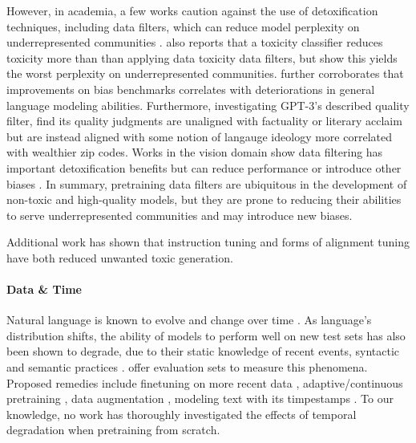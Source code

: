 \documentclass{article}
\begin{document}
However, in academia, a few works caution against the use of detoxification techniques, including data filters, which can reduce model perplexity on underrepresented communities \citep{xu-etal-2021-detoxifying, welbl2021challenges}.
\citet{welbl2021challenges} also reports that a toxicity classifier reduces toxicity more than than applying data toxicity data filters, but \citet{xu-etal-2021-detoxifying} show this yields the worst perplexity on underrepresented communities.
\citet{meade2022empirical} further corroborates that improvements on bias benchmarks correlates with deteriorations in general language modeling abilities.
Furthermore, investigating GPT-3's described quality filter, \citet{gururangan2022whose} find its quality judgments are unaligned with factuality or literary acclaim but are instead aligned with some notion of langauge ideology more correlated with wealthier zip codes.
Works in the vision domain show data filtering has important detoxification benefits but can reduce performance \citep{nichol2022glide} or introduce other biases \citep{dalle2pretraining2022}.
In summary, pretraining data filters are ubiquitous in the development of non-toxic and high-quality models, but they are prone to reducing their abilities to serve underrepresented communities and may introduce new biases.

Additional work has shown that instruction tuning \citep{chung2022scaling,longpre2023flan} and forms of alignment tuning \citep{ouyang2022training, bai2022constitutional} have both reduced unwanted toxic generation.

\vspace{-3mm}
\paragraph{Data \& Time}
\label{sec:rw-time}
Natural language is known to evolve and change over time \citep{altmann2009beyond,labov2011principles,eisenstein2014diffusion,jaidka-etal-2018-diachronic}.
As language's distribution shifts, the ability of models to perform well on new test sets has also been shown to degrade, due to their static knowledge of recent events, syntactic and semantic practices \citep{lazaridou2021mind,agarwal2022temporal,longpre2021entity}.
\citet{luu2021time,lazaridou2021mind,pmlr-v162-liska22a,yaowild,zhang2021situatedqa,jang2022temporalwiki} offer evaluation sets to measure this phenomena.
Proposed remedies include finetuning on more recent data \citep{luu2021time}, adaptive/continuous pretraining \citep{lazaridou2021mind,rottger-pierrehumbert-2021-temporal-adaptation}, data augmentation \citep{singh2022addressing}, modeling text with its timpestamps \citep{dhingra2022time}.
To our knowledge, no work has thoroughly investigated the effects of temporal degradation when pretraining from scratch.
\end{document}
